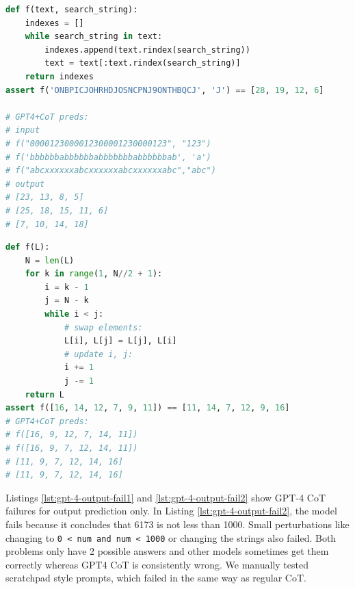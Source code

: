 \noindent\begin{minipage}[t]{.47\textwidth} %
\vspace{0pt}
\begin{lstlisting}[caption={GPT-4 CoT failures where solutions requires counting to 30}, label={lst:gpt-4-hard1}, breaklines=true, language=python]
def f(text, search_string):
    indexes = []
    while search_string in text:
        indexes.append(text.rindex(search_string))
        text = text[:text.rindex(search_string)]
    return indexes
assert f('ONBPICJOHRHDJOSNCPNJ9ONTHBQCJ', 'J') == [28, 19, 12, 6]

# GPT4+CoT preds:
# input
# f("0000123000012300001230000123", "123")
# f('bbbbbbabbbbbbabbbbbbbabbbbbbab', 'a')
# f("abcxxxxxxabcxxxxxxabcxxxxxxabc","abc")
# output
# [23, 13, 8, 5]
# [25, 18, 15, 11, 6]
# [7, 10, 14, 18]
\end{lstlisting}
\end{minipage}\hfill %
\begin{minipage}[t]{.47\textwidth}
\vspace{0pt}
\begin{lstlisting}[caption={GPT-4 CoT failure, cannot easily tell the answer without running the loops}, label={lst:gpt-4-hard2}, breaklines=true, language=python]
def f(L):
    N = len(L)
    for k in range(1, N//2 + 1):
        i = k - 1
        j = N - k
        while i < j:
            # swap elements:
            L[i], L[j] = L[j], L[i]
            # update i, j:
            i += 1
            j -= 1
    return L
assert f([16, 14, 12, 7, 9, 11]) == [11, 14, 7, 12, 9, 16]
# GPT4+CoT preds:
# f([16, 9, 12, 7, 14, 11])
# f([16, 9, 7, 12, 14, 11])
# [11, 9, 7, 12, 14, 16]
# [11, 9, 7, 12, 14, 16]
\end{lstlisting}
\end{minipage}


Listings \ref{lst:gpt-4-output-fail1} and \ref{lst:gpt-4-output-fail2} show GPT-4 CoT failures for output prediction only. In Listing \ref{lst:gpt-4-output-fail2}, the model fails because it concludes that 6173 is not less than 1000. Small perturbations like changing to \texttt{0 < num and num < 1000} or changing the strings also failed. Both problems only have 2 possible answers and other models sometimes get them correctly whereas GPT4 CoT is consistently wrong. We manually tested scratchpad \cite{nye2021show} style prompts, which failed in the same way as regular CoT.


